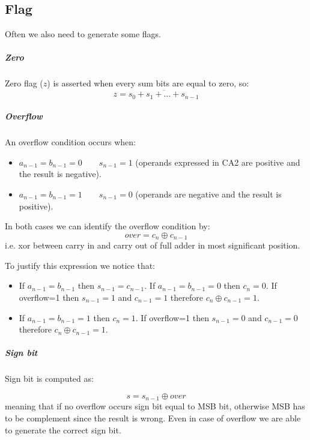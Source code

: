 
\subsection{Flag}
Often we also need to generate some flags.

\subparagraph{Zero}
Zero flag ($z$) is asserted when every sum bits are equal to zero, so:
$$z=\overline{s_0+s_1+...+s_{n-1}} $$

\subparagraph{Overflow}

An overflow condition occurs when:
\begin{itemize}
  \item $a_{n-1}=b_{n-1}=0 \qquad s_{n-1}=1 $ (operands expressed in CA2 are
    positive and the result is negative).
  \item $a_{n-1}=b_{n-1}=1 \qquad s_{n-1}=0$ (operands are negative and the
    result is positive).
\end{itemize}

In both cases we can identify the overflow condition by:
$$over=c_n  \oplus c_{n-1} $$
i.e. xor between carry in and carry out of full adder in most significant
position.

To justify this expression we notice that:
\begin{itemize}
  \item
    \subitem If $a_{n-1}=b_{n-1}$ then $s_{n-1}=c_{n-1}$.
    \subitem If $a_{n-1}=b_{n-1}=0$ then $c_n=0$.
  If overflow=1 then $s_{n-1}=1$ and $c_{n-1}=1$ therefore $c_n \oplus c_{n-1}=1$.

  \item
    \subitem If $a_{n-1}=b_{n-1}=1$ then $c_n=1$.
  If overflow=1 then $s_{n-1}=0$ and $c_{n-1}=0$ therefore $c_n \oplus c_{n-1}=1$.

\end{itemize}

\subparagraph{Sign bit}
Sign bit is computed as:

$$s=s_{n-1} \oplus over $$
meaning that if no overflow occurs sign bit equal to MSB bit, otherwise MSB has
to be complement since the result is wrong. Even in case of overflow we are able
to generate the correct sign bit.


